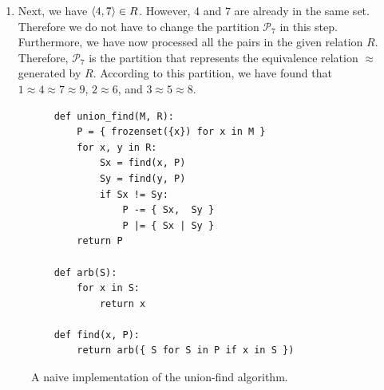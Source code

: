 \begin{enumerate}
      \\[0.2cm]
      \hspace*{1.3cm}
      $\mathcal{P}_7 := \bigl\{ \{1, 4, 7, 9\}, \{2,6\}, \{3,5,8\} \bigr\}$.
\item Next, we have $\pair(4,7) \in R$.  However, $4$ and $7$ are already in the same set.
      Therefore we do not have to change the partition $\mathcal{P}_7$ in this step.
      Furthermore, we have now processed all the pairs in the given relation $R$.
      Therefore, $\mathcal{P}_7$ is the partition that represents the equivalence relation $\approx$ generated
      by $R$.  According to this partition, we have found that
      \\[0.2cm]
      \hspace*{1.3cm}
      $1 \approx 4 \approx 7 \approx 9$, \quad $2 \approx 6$,  \quad and \quad $3 \approx 5 \approx 8$.
\end{enumerate}
 
\begin{figure}[!ht]
\centering
\begin{verbatim}
    def union_find(M, R):
        P = { frozenset({x}) for x in M } 
        for x, y in R:
            Sx = find(x, P)
            Sy = find(y, P)
            if Sx != Sy:
                P -= { Sx,  Sy }
                P |= { Sx | Sy }
        return P
    
    def arb(S):
        for x in S:
            return x
    
    def find(x, P):
        return arb({ S for S in P if x in S })    
\end{verbatim}
\vspace*{-0.3cm}
\caption{A naive implementation of the union-find algorithm.}
\label{fig:Union-Find-Naive.ipynb}
\end{figure}


